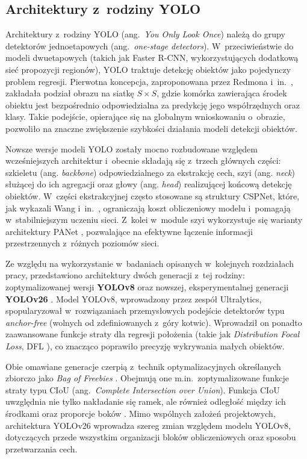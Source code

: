 \subsection{Architektury z~rodziny YOLO}
Architektury z~rodziny YOLO (ang.\ \emph{You Only Look Once}) należą do grupy detektorów jednoetapowych (ang.\ \emph{one-stage detectors}). W~przeciwieństwie do modeli dwuetapowych (takich jak Faster R-CNN, wykorzystujących dodatkową sieć propozycji regionów), YOLO traktuje detekcję obiektów jako pojedynczy problem regresji. Pierwotna koncepcja, zaproponowana przez Redmona i~in.\ \cite{Redmon2016}, zakładała podział obrazu na siatkę $S \times S$, gdzie komórka zawierająca środek obiektu jest bezpośrednio odpowiedzialna za predykcję jego współrzędnych oraz klasy. Takie podejście, opierające się na globalnym wnioskowaniu o~obrazie, pozwoliło na znaczne zwiększenie szybkości działania modeli detekcji obiektów.

Nowsze wersje modeli YOLO zostały mocno rozbudowane względem wcześniejszych architektur i~obecnie składają się z~trzech głównych części: szkieletu (ang. \emph{backbone}) odpowiedzialnego za ekstrakcję cech, szyi (ang. \emph{neck}) służącej do ich agregacji oraz głowy (ang. \emph{head}) realizującej końcową detekcję obiektów. W~części ekstrakcyjnej często stosowane są struktury CSPNet, które, jak wykazali Wang i~in.\ \cite{Wang2020}, ograniczają koszt obliczeniowy modelu i~pomagają w~stabilniejszym uczeniu sieci. Z~kolei w~module szyi wykorzystuje się warianty architektury PANet \cite{Liu2018}, pozwalające na efektywne łączenie informacji przestrzennych z~różnych poziomów sieci.

Ze względu na wykorzystanie w~badaniach opisanych w~kolejnych rozdziałach pracy, przedstawiono architektury dwóch generacji z~tej rodziny: zoptymalizowanej wersji \textbf{YOLOv8} \cite{Jocher2023_YOLOv8} oraz nowszej, eksperymentalnej generacji \textbf{YOLOv26} \cite{Jocher2024_YOLOv26}. Model YOLOv8, wprowadzony przez zespół Ultralytics, spopularyzował w~rozwiązaniach przemysłowych podejście detektorów typu \emph{anchor-free} (wolnych od zdefiniowanych z~góry kotwic). Wprowadził on ponadto zaawansowane funkcje straty dla regresji położenia (takie jak \emph{Distribution Focal Loss}, DFL \cite{Li2020}), co znacząco poprawiło precyzję wykrywania małych obiektów.

Obie omawiane generacje czerpią z~technik optymalizacyjnych określanych zbiorczo jako \emph{Bag of Freebies} \cite{Wang2023}. Obejmują one m.in.\ zoptymalizowane funkcje straty typu CIoU (ang.\ \emph{Complete Intersection over Union}). Funkcja CIoU uwzględnia nie tylko nakładanie się ramek, ale również odległość między ich środkami oraz proporcje boków \cite{Zheng2020}. Mimo wspólnych założeń projektowych, architektura YOLOv26 wprowadza szereg zmian względem modelu YOLOv8, dotyczących przede wszystkim organizacji bloków obliczeniowych oraz sposobu przetwarzania cech.

